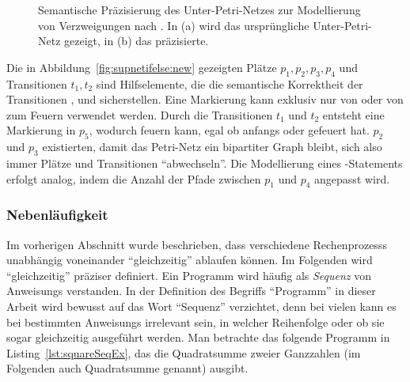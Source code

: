\begin{figure}
	\caption[Semantische Präzisierung des Unter-Petri-Netzes zur Modellierung von Verzweigungen.]{Semantische Präzisierung des Unter-Petri-Netzes zur Modellierung von Verzweigungen nach \cite[Abbildung~3.1]{Goel1990}. In (a) wird das ursprüngliche Unter-Petri-Netz gezeigt, in (b) das präzisierte.}\label{fig:supnetifelse}
\end{figure}

Die in Abbildung~\ref{fig:supnetifelse:new} gezeigten Plätze $p_1,p_2,p_3,p_4$ und Transitionen $t_1,t_2$ sind Hilfselemente, die die semantische Korrektheit der Transitionen ,  und  sicherstellen. Eine Markierung kann exklusiv nur von  oder von  zum Feuern verwendet werden. Durch die Transitionen $t_1$ und $t_2$ entsteht eine Markierung in $p_5$, wodurch  feuern kann, egal ob anfangs  oder  gefeuert hat. $p_2$ und $p_3$ existierten, damit das Petri-Netz ein bipartiter Graph bleibt, sich also immer Plätze und Transitionen \enquote{abwechseln}. Die Modellierung eines -Statements erfolgt analog, indem die Anzahl der Pfade zwischen $p_1$ und $p_4$ angepasst wird.

\subsubsection{Nebenläufigkeit}\label{sec:nebenl}
Im vorherigen Abschnitt wurde beschrieben, dass verschiedene \glspl{Rechenprozess} unabhängig voneinander \enquote{gleichzeitig} ablaufen können. Im Folgenden wird \enquote{gleichzeitig} präziser definiert. Ein \gls{Programm} wird häufig als \emph{Sequenz} von \glspl{Anweisung} verstanden. In der Definition des Begriffs \enquote{\gls{Programm}} in dieser Arbeit wird bewusst auf das Wort \enquote{Sequenz} verzichtet, denn bei vielen  kann es bei bestimmten \glspl{Anweisung} irrelevant sein, in welcher Reihenfolge oder ob sie sogar gleichzeitig ausgeführt werden. Man betrachte das folgende \gls{Programm} in Listing~\ref{lst:squareSeqEx}, das die Quadratsumme zweier Ganzzahlen (im Folgenden auch Quadratsumme genannt) ausgibt.

